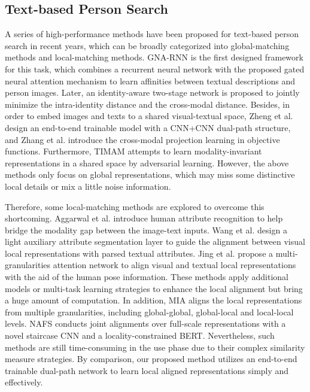 \documentclass[review]{elsarticle}
\begin{document}
\subsection{Text-based Person Search}
A series of high-performance methods have been proposed for text-based person search in recent years, which can be broadly categorized into global-matching methods and local-matching methods. GNA-RNN \cite{7} is the first designed framework for this task, which combines a recurrent neural network with the proposed gated neural attention mechanism to learn affinities between textual descriptions and person images. Later, an identity-aware two-stage network \cite{13} is proposed to jointly minimize the intra-identity distance and the cross-modal distance. Besides, in order to embed images and texts to a shared visual-textual space, Zheng et al. \cite{12} design an end-to-end trainable model with a CNN+CNN dual-path structure, and Zhang et al. \cite{14} introduce the cross-modal projection learning in objective functions. Furthermore, TIMAM \cite{15} attempts to learn modality-invariant representations in a shared space by adversarial learning. However, the above methods only focus on global representations, which may miss some distinctive local details or mix a little noise information.

Therefore, some local-matching methods are explored to overcome this shortcoming. Aggarwal et al. \cite{21} introduce human attribute recognition to help bridge the modality gap between the image-text inputs. Wang et al. \cite{18} design a light auxiliary attribute segmentation layer to guide the alignment between visual local representations with parsed textual attributes. Jing et al. \cite{17} propose a multi-granularities attention network to align visual and textual local representations with the aid of the human pose information. These methods apply additional models or multi-task learning strategies to enhance the local alignment but bring a huge amount of computation. In addition, MIA \cite{19} aligns the local representations from multiple granularities, including global-global, global-local and local-local levels. NAFS \cite{16} conducts joint alignments over full-scale representations with a novel staircase CNN and a locality-constrained BERT. Nevertheless, such methods are still time-consuming in the use phase due to their complex similarity measure strategies. By comparison, our proposed method utilizes an end-to-end trainable dual-path network to learn local aligned representations simply and effectively.
\end{document}
